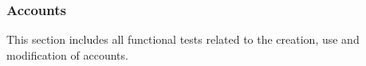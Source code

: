 \documentclass[12pt, titlepage]{article}
\begin{document}
\begin{enumerate}







\end{enumerate}

\subsubsection{Accounts}

This section includes all functional tests related to the creation, use and
modification of accounts.
\end{document}
